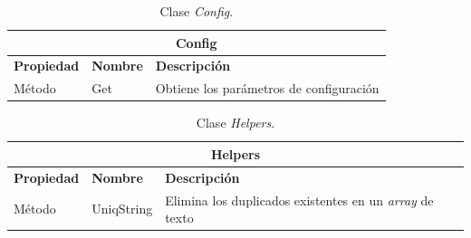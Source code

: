 \begin{table}[H]
    \begin{center}
        \begin{tabularx}{\textwidth}{| l | l | X |}
            \hline
            \multicolumn{3}{c}{ \textbf{Config} } \\ \hline
            \textbf{Propiedad} & \textbf{Nombre} & \textbf{Descripción} \\ \hline
            Método & Get & Obtiene los parámetros de configuración \\ \hline
        \end{tabularx}
    \end{center}
    \caption{Clase \textit{Config}.}
    \label{tab:classConfig}
\end{table}

\begin{table}[H]
    \begin{center}
        \begin{tabularx}{\textwidth}{| l | l | X |}
            \hline
            \multicolumn{3}{c}{ \textbf{Helpers} } \\ \hline
            \textbf{Propiedad} & \textbf{Nombre} & \textbf{Descripción} \\ \hline
            Método & UniqString & Elimina los duplicados existentes en un \textit{array} de texto \\ \hline
        \end{tabularx}
    \end{center}
    \caption{Clase \textit{Helpers}.}
    \label{tab:classHelpers}
\end{table}

